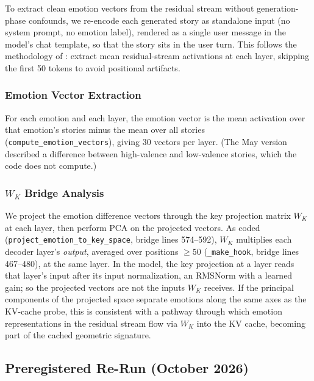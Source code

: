 To extract clean emotion vectors from the residual stream without generation-phase confounds, we re-encode each generated story as standalone input (no system prompt, no emotion label), rendered as a single user message in the model's chat template, so that the story sits in the user turn. This follows the methodology of \citet{anthropic2026emotions}: extract mean residual-stream activations at each layer, skipping the first 50 tokens to avoid positional artifacts.

\subsubsection{Emotion Vector Extraction}

For each emotion and each layer, the emotion vector is the mean activation over that emotion's stories minus the mean over all stories (\texttt{compute\_emotion\_vectors}), giving 30 vectors per layer. (The May version described a difference between high-valence and low-valence stories, which the code does not compute.)

\subsubsection{$W_K$ Bridge Analysis}
\label{sec:bridge_method}

We project the emotion difference vectors through the key projection matrix $W_K$ at each layer, then perform PCA on the projected vectors. As coded (\texttt{project\_emotion\_to\_key\_space}, bridge lines 574--592), $W_K$ multiplies each decoder layer's \emph{output}, averaged over positions $\geq 50$ (\texttt{\_make\_hook}, bridge lines 467--480), at the same layer. In the model, the key projection at a layer reads that layer's input after its input normalization, an RMSNorm with a learned gain; so the projected vectors are not the inputs $W_K$ receives. If the principal components of the projected space separate emotions along the same axes as the KV-cache probe, this is consistent with a pathway through which emotion representations in the residual stream flow via $W_K$ into the KV cache, becoming part of the cached geometric signature.

\subsection{Preregistered Re-Run (October 2026)}
\label{sec:rerun_method}

